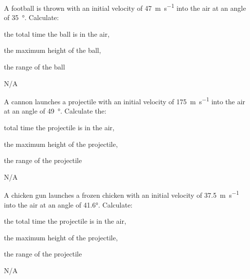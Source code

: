 \begin{question}[ID=upwardly-C-Q02,topic=projectiles,difficulty=C]
    A football is thrown with an initial velocity of
        \SI{47}{\meter\per\second} into the air at
        an angle of \SI{35}{\degree}.
    Calculate:
    \begin{enumerate*}[label=\arabic*)]
        \item the total time the ball is in the air,
        \item the maximum height of the ball,
        \item the range of the ball
    \end{enumerate*}
\end{question}
\begin{solution}
    N/A
\end{solution}


\begin{question}[ID=upwardly-C-Q03,topic=projectiles,difficulty=C]
    A cannon launches a projectile with an initial velocity
        of \SI{175}{\meter\per\second} into the air at an angle
        of \SI{49}{\degree}.
    Calculate the:
    \begin{enumerate*}[label=\arabic*)]
        \item total time the projectile is in the air,
        \item the maximum height of the projectile,
        \item the range of the projectile
    \end{enumerate*}
\end{question}
\begin{solution}
    N/A
\end{solution}


\begin{question}[ID=upwardly-C-Q04,topic=projectiles,difficulty=C]
    A chicken gun launches a frozen chicken with an initial velocity
        of \SI{37.5}{\meter\per\second} into the air at an angle
        of \ang{41.6}.
    Calculate:
    \begin{enumerate*}[label=\arabic*)]
        \item the total time the projectile is in the air,
        \item the maximum height of the projectile,
        \item the range of the projectile
    \end{enumerate*}
\end{question}
\begin{solution}
    N/A
\end{solution}


